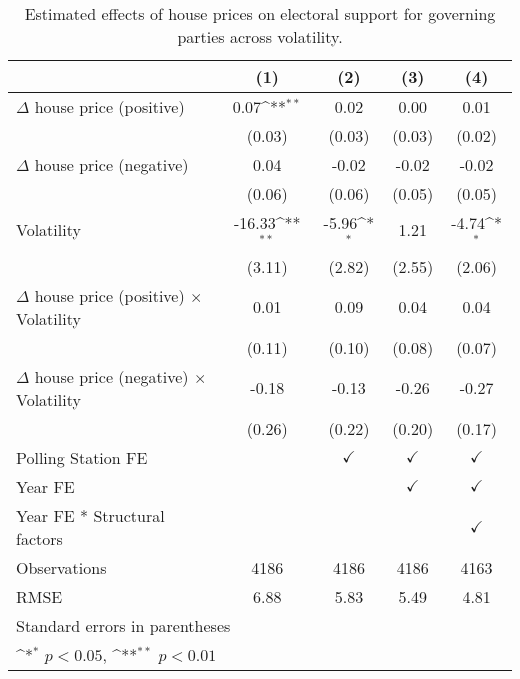 \begin{table}[htbp]\centering
\def\sym#1{\ifmmode^{#1}\else\(^{#1}\)\fi}
\caption{Estimated effects of house prices on electoral support for governing parties across volatility.}
\begin{tabular}{l*{4}{c}}
\hline\hline
                    &\multicolumn{1}{c}{(1)}        &\multicolumn{1}{c}{(2)}        &\multicolumn{1}{c}{(3)}        &\multicolumn{1}{c}{(4)}        \\
\hline
$\Delta$ house price (positive)&        0.07\sym{**}&        0.02        &        0.00        &        0.01        \\
                    &      (0.03)        &      (0.03)        &      (0.03)        &      (0.02)        \\
[1em]
$\Delta$ house price (negative)&        0.04        &       -0.02        &       -0.02        &       -0.02        \\
                    &      (0.06)        &      (0.06)        &      (0.05)        &      (0.05)        \\
[1em]
Volatility          &      -16.33\sym{**}&       -5.96\sym{*} &        1.21        &       -4.74\sym{*} \\
                    &      (3.11)        &      (2.82)        &      (2.55)        &      (2.06)        \\
[1em]
$\Delta$ house price (positive) $\times$ Volatility&        0.01        &        0.09        &        0.04        &        0.04        \\
                    &      (0.11)        &      (0.10)        &      (0.08)        &      (0.07)        \\
[1em]
$\Delta$ house price (negative) $\times$ Volatility&       -0.18        &       -0.13        &       -0.26        &       -0.27        \\
                    &      (0.26)        &      (0.22)        &      (0.20)        &      (0.17)        \\
[1em]
\hline Polling Station FE&                    &$\checkmark$        &$\checkmark$        &$\checkmark$        \\
[1em]
Year FE             &                    &                    &$\checkmark$        &$\checkmark$        \\
[1em]
Year FE * Structural factors&                    &                    &                    &$\checkmark$        \\
\hline
Observations        &        4186        &        4186        &        4186        &        4163        \\
RMSE                &        6.88        &        5.83        &        5.49        &        4.81        \\
\hline\hline
\multicolumn{5}{l}{\footnotesize Standard errors in parentheses}\\
\multicolumn{5}{l}{\footnotesize \sym{*} \(p<0.05\), \sym{**} \(p<0.01\)}\\
\end{tabular}
\end{table}
